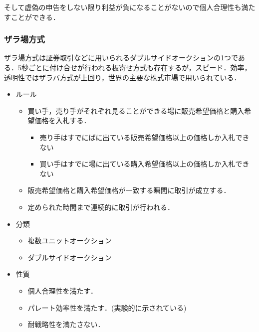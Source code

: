 そして虚偽の申告をしない限り利益が負になることがないので個人合理性も満たすことができる．

\hypertarget{ux30b6ux30e9ux5834ux65b9ux5f0f}{%
\subsubsection{ザラ場方式}\label{ux30b6ux30e9ux5834ux65b9ux5f0f}}

ザラ場方式は証券取引などに用いられるダブルサイドオークションの1つである．5秒ごとに付け合せが行われる板寄せ方式も存在するが，スピード．効率，透明性ではザラバ方式が上回り，世界の主要な株式市場で用いられている\cite{zaraba}．

\begin{itemize}
\tightlist
\item
  ルール

  \begin{itemize}
  \tightlist
  \item
    買い手，売り手がそれぞれ見ることができる場に販売希望価格と購入希望価格を入札する．

    \begin{itemize}
    \tightlist
    \item
      売り手はすでにばに出ている販売希望価格以上の価格しか入札できない
    \item
      買い手はすでに場に出ている購入希望価格以上の価格しか入札できない
    \end{itemize}
  \item
    販売希望価格と購入希望価格が一致する瞬間に取引が成立する．
  \item
    定められた時間まで連続的に取引が行われる．
  \end{itemize}
\item
  分類

  \begin{itemize}
  \tightlist
  \item
    複数ユニットオークション
  \item
    ダブルサイドオークション
  \end{itemize}
\item
  性質

  \begin{itemize}
  \tightlist
  \item
    個人合理性を満たす．
  \item
    パレート効率性を満たす．(実験的に示されている\cite{cliff1997})
  \item
    耐戦略性を満たさない．
  \end{itemize}
\end{itemize}

